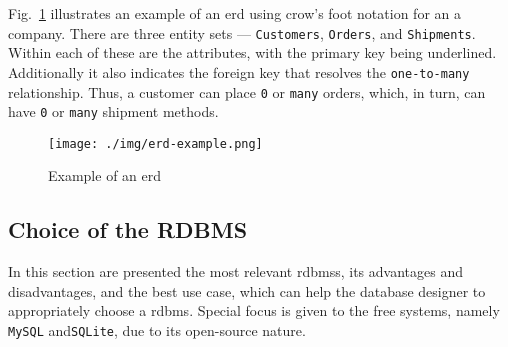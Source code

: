 Fig.~\ref{fig:erd-example} illustrates an example of an \acrfull{erd} using
crow's foot notation for an a company. There are three entity sets ---
\texttt{Customers}, \texttt{Orders}, and \texttt{Shipments}. Within each of
these are the attributes, with the primary key being underlined. Additionally it
also indicates the foreign key that resolves the \texttt{one-to-many}
relationship. Thus, a customer can place \texttt{0} or \texttt{many} orders, which, in
turn, can have \texttt{0} or \texttt{many} shipment methods.

%
\begin{figure}[htb!]
\centering
    \texttt{[image: ./img/erd-example.png]}
  \caption{Example of an \gls{erd}}%
\label{fig:erd-example}
\end{figure}
%
%
\subsection{Choice of the RDBMS}%
\label{sec:choice-rdbms}
In this section are presented the most relevant \glspl{rdbms}, its advantages
and disadvantages, and the best use case, which can help the database designer
to appropriately choose a \gls{rdbms}. Special focus is given to the free
systems, namely \texttt{MySQL} and\texttt{SQLite}, due to its open-source nature.

